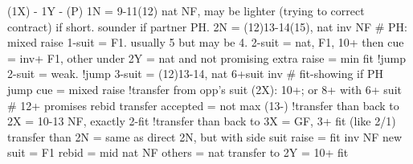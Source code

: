 (1X) - 1Y - (P)
1N = 9-11(12) nat NF, may be lighter (trying to correct contract) if short. sounder if partner PH.
2N = (12)13-14(15), nat inv NF  # PH: mixed raise
1-suit = F1. usually 5 but may be 4.
2-suit = nat, F1, 10+
    then cue = inv+ F1, other under 2Y = nat and not promising extra
    raise = min fit
!jump 2-suit = weak.
!jump 3-suit = (12)13-14, nat 6+suit inv  # fit-showing if PH
jump cue = mixed raise
!transfer from opp's suit (2X): 10+; or 8+ with 6+ suit  # 12+ promises rebid
    transfer accepted = not max (13-)
        !transfer than back to 2X = 10-13 NF, exactly 2-fit
        !transfer than back to 3X = GF, 3+ fit (like 2/1)
        transfer than 2N = same as direct 2N, but with side suit
    raise = fit inv NF
    new suit = F1
    rebid = mid nat NF
    others = nat
transfer to 2Y = 10+ fit